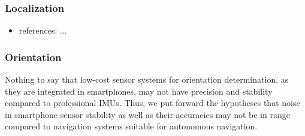 \documentclass[review]{elsarticle}
\begin{document}
\subsubsection{Localization}
\label{sec:technology:sensors:localization}

\begin{itemize}
\item references: ...
\end{itemize}

\subsubsection{Orientation}
\label{sec:technology:sensors:orientation}

Nothing to say that low-cost sensor systems for orientation determination, as they are integrated in smartphones, may not have precision and stability compared to professional \glspl{IMU}. Thus, we put forward the hypotheses that noise in smartphone sensor stability as well as their accuracies may not be in range compared to navigation systems suitable for autonomous navigation.
\end{document}
